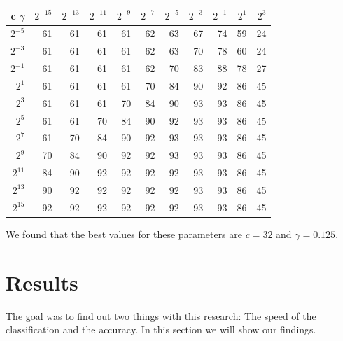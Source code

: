 \documentclass[a4paper]{article}
\begin{document}
\begin{tabular}{|r|r r r r r r r r r r|}
\hline
c $\gamma$ & $2^{-15}$ & $2^{-13}$ & $2^{-11}$ & $2^{-9}$ & $2^{-7}$ &
	$2^{-5}$ & $2^{-3}$ & $2^{-1}$ & $2^{1}$ & $2^{3}$\\
\hline
$2^{-5}$ &       61 &       61 &       61 &       61 &       62 &
       63 &       67 &       74 &       59 &       24\\
$2^{-3}$ &       61 &       61 &       61 &       61 &       62 &
       63 &       70 &       78 &       60 &       24\\
$2^{-1}$ &       61 &       61 &       61 &       61 &       62 &
       70 &       83 &       88 &       78 &       27\\
 $2^{1}$ &       61 &       61 &       61 &       61 &       70 &
        84 &       90 &       92 &       86 &       45\\
 $2^{3}$ &       61 &       61 &       61 &       70 &       84 &
        90 &       93 &       93 &       86 &       45\\
 $2^{5}$ &       61 &       61 &       70 &       84 &       90 &
        92 &       93 &       93 &       86 &       45\\
 $2^{7}$ &       61 &       70 &       84 &       90 &       92 &
        93 &       93 &       93 &       86 &       45\\
 $2^{9}$ &       70 &       84 &       90 &       92 &       92 & 
       93 &       93 &       93 &       86 &       45\\
$2^{11}$ &       84 &       90 &       92 &       92 &       92 &
       92 &       93 &       93 &       86 &       45\\
$2^{13}$ &       90 &       92 &       92 &       92 &       92 &
       92 &       93 &       93 &       86 &       45\\
$2^{15}$ &       92 &       92 &       92 &       92 &       92 &
       92 &       93 &       93 &       86 &       45\\
\hline
\end{tabular}

We found that the best values for these parameters are $c = 32$ and
$\gamma = 0.125$.

\section{Results}

The goal was to find out two things with this research: The speed of the
classification and the accuracy. In this section we will show our findings.
\end{document}
